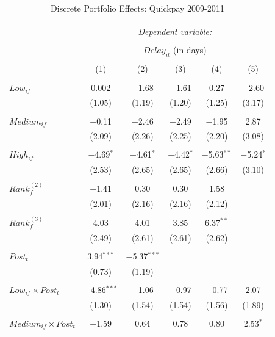 \documentclass[]{article}
\begin{document}
\begin{table}[H] \centering 
  \caption{Discrete Portfolio Effects: Quickpay 2009-2011} 
  \label{} 
\small 
\begin{tabular}{@{\extracolsep{-2pt}}lccccc} 
\\[-1.8ex]\hline 
\hline \\[-1.8ex] 
 & \multicolumn{5}{c}{\textit{Dependent variable:}} \\ 
\cline{2-6} 
\\[-1.8ex] & \multicolumn{5}{c}{$Delay_{it}$ (in days)} \\ 
\\[-1.8ex] & (1) & (2) & (3) & (4) & (5)\\ 
\hline \\[-1.8ex] 
 $Low_{if}$ & 0.002 & $-$1.68 & $-$1.61 & 0.27 & $-$2.60 \\ 
  & (1.05) & (1.19) & (1.20) & (1.25) & (3.17) \\ 
  & & & & & \\ 
 $Medium_{if}$ & $-$0.11 & $-$2.46 & $-$2.49 & $-$1.95 & 2.87 \\ 
  & (2.09) & (2.26) & (2.25) & (2.20) & (3.08) \\ 
  & & & & & \\ 
 $High_{if}$ & $-$4.69$^{*}$ & $-$4.61$^{*}$ & $-$4.42$^{*}$ & $-$5.63$^{**}$ & $-$5.24$^{*}$ \\ 
  & (2.53) & (2.65) & (2.65) & (2.66) & (3.10) \\ 
  & & & & & \\ 
 $Rank_f^{(2)}$ & $-$1.41 & 0.30 & 0.30 & 1.58 &  \\ 
  & (2.01) & (2.16) & (2.16) & (2.12) &  \\ 
  & & & & & \\ 
 $Rank_f^{(3)}$ & 4.03 & 4.01 & 3.85 & 6.37$^{**}$ &  \\ 
  & (2.49) & (2.61) & (2.61) & (2.62) &  \\ 
  & & & & & \\ 
 $Post_t$ & 3.94$^{***}$ & $-$5.37$^{***}$ &  &  &  \\ 
  & (0.73) & (1.19) &  &  &  \\ 
  & & & & & \\ 
 $Low_{if} \times Post_t$ & $-$4.86$^{***}$ & $-$1.06 & $-$0.97 & $-$0.77 & 2.07 \\ 
  & (1.30) & (1.54) & (1.54) & (1.56) & (1.89) \\ 
  & & & & & \\ 
 $Medium_{if} \times Post_t$ & $-$1.59 & 0.64 & 0.78 & 0.80 & 2.53$^{*}$ \\ 

\end{tabular}
\end{table}
\end{document}
